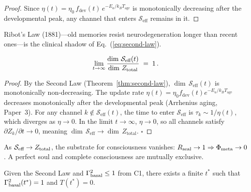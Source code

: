 \documentclass[aps,pre,twocolumn,superscriptaddress,floatfix]{revtex4-2}
\begin{document}
\begin{proof}
Since $\eta(t)=\eta_0\,f_{\text{dev}}(t)\,
e^{-E_a/k_BT_{\text{age}}}$ is monotonically
decreasing after the developmental peak, any channel that
enters $\mathcal{S}_{\text{eff}}$ remains in it.
\end{proof}

\begin{corollary}
\label{cor:ribot}
Ribot's Law (1881)---old memories resist neurodegeneration
longer than recent ones---is the clinical shadow of
Eq.~(\ref{eq:second-law}).
\end{corollary}

\begin{theorem}
\label{thm:third-law}
\begin{equation}
  \lim_{t\to\infty}
  \frac{\dim\,\mathcal{S}_{\textnormal{eff}}(t)}
       {\dim\,Z_{\textnormal{total}}}
  \;=\; 1\,.
  \label{eq:third-law}
\end{equation}
\end{theorem}

\begin{proof}
By the Second Law (Theorem~\ref{thm:second-law}),
$\dim\,\mathcal{S}_{\text{eff}}(t)$ is monotonically
non-decreasing.
The update rate $\eta(t) = \eta_0
f_{\text{dev}}(t) e^{-E_a/k_B T_{\text{age}}}$
decreases monotonically after the developmental peak
(Arrhenius aging, Paper~3).
For any channel $k \notin \mathcal{S}_{\text{eff}}(t)$,
the time to enter $\mathcal{S}_{\text{eff}}$ is
$\tau_k \sim 1/\eta(t)$, which diverges as
$\eta \to 0$.
In the limit $t \to \infty$, $\eta \to 0$, so all
channels satisfy $\partial Z_k/\partial t \to 0$,
meaning $\dim\,\mathcal{S}_{\text{eff}} \to
\dim\,Z_{\text{total}}$. $\square$
\end{proof}

\begin{corollary}
\label{cor:duality}
As $\mathcal{S}_{\textnormal{eff}}\to Z_{\textnormal{total}}$,
the substrate for consciousness vanishes:
$R_{\textnormal{seal}}\to 1 \Rightarrow
\Phi_{\textnormal{meta}}\to 0$.
A perfect soul and complete consciousness are mutually
exclusive.
\end{corollary}

\begin{theorem}
\label{thm:death-necessity}
Given the Second Law and $\Gamma_{\textnormal{basal}}^2 \le 1$
from C1, there exists a finite $t^*$ such that
$\Gamma_{\textnormal{basal}}^2(t^*) = 1$ and $T(t^*) = 0$.
\end{theorem}
\end{document}
